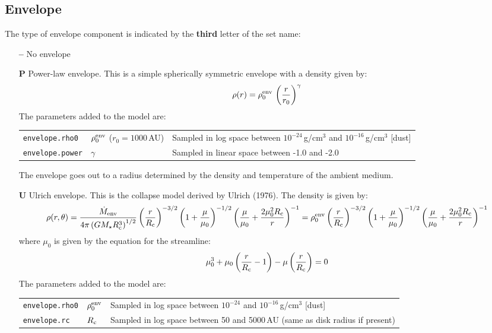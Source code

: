 \documentclass[10pt]{article}
\newcommand{\mdote}{\dot{M}_{\rm env}}
\newcommand{\mstar}{M_\star}
\newcommand{\rc}{R_{\rm c}}
\begin{document}
\subsection{Envelope}

The type of envelope component is indicated by the \textbf{third} letter of the set name:

\begin{itemize}

\item[\textbf{--}] No envelope

\item[\textbf{P}] Power-law envelope. This is a simple spherically symmetric envelope with a density given by:
$$
\rho(r) = \rho_0^{\rm env}\,\left(\frac{r}{r_0}\right)^\gamma
$$
The parameters added to the model are:

\begin{center}
  \begin{tabular}{llp{4in}}
    \texttt{envelope.rho0} & $\rho_0^{\rm env}$ ($r_0=1000$\,AU) & Sampled in log space between $10^{-24}$\,g/cm$^3$ and $10^{-16}$\,g/cm$^3$ [dust]\\
     \texttt{envelope.power} & $\gamma$ & Sampled in linear space between -1.0 and -2.0 \\
  \end{tabular}
\end{center}

The envelope goes out to a radius determined by the density and temperature of the ambient medium.

\item[\textbf{U}] Ulrich envelope. This is the collapse model derived by Ulrich (1976). The density is given by:
$$
\rho(r,\theta) = \frac{\mdote}{4\pi\left(G\mstar\rc^3\right)^{1/2}}\left(\frac{r}{\rc}\right)^{-3/2}\left(1 + \frac{\mu}{\mu_0}\right)^{-1/2}\left(\frac{\mu}{\mu_0} + \frac{2\mu_0^2\rc}{r}\right)^{-1} = \rho_0^{\rm env}\left(\frac{r}{\rc}\right)^{-3/2}\left(1 + \frac{\mu}{\mu_0}\right)^{-1/2}\left(\frac{\mu}{\mu_0} + \frac{2\mu_0^2\rc}{r}\right)^{-1}
$$
where $\mu_0$ is given by the equation for the streamline:
$$
\mu_0^3 + \mu_0\left(\frac{r}{\rc} - 1\right) - \mu\left(\frac{r}{\rc}\right) = 0
$$
The parameters added to the model are:

\begin{center}
  \begin{tabular}{llp{4in}}
    \texttt{envelope.rho0} & $\rho_0^{\rm env}$ & Sampled in log space between $10^{-24}$ and $10^{-16}$\,g/cm$^3$ [dust] \\
    \texttt{envelope.rc} & $\rc$ & Sampled in log space between 50 and 5000\,AU (same as disk radius if present)  \\
  \end{tabular}
\end{center}


\end{itemize}
\end{document}

